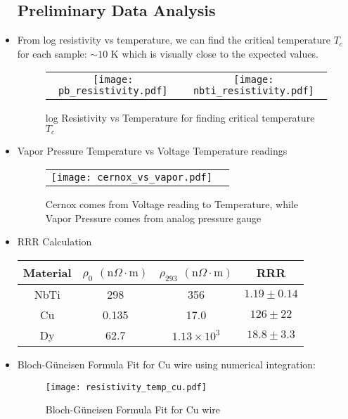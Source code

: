 \documentclass{article}
\begin{document}
\begin{itemize}
    \subsection*{Preliminary Data Analysis}
    \item From log resistivity vs temperature, we can find the critical temperature $T_c$ for each sample: $\sim 10$ K which is visually close to the expected values.
    \begin{figure}[ht]
        \centering
        \begin{tabular}{cc}
            \texttt{[image: pb\_resistivity.pdf]} & \texttt{[image: nbti\_resistivity.pdf]} 
        \end{tabular}
        \caption{log Resistivity vs Temperature for finding critical temperature $T_c$}
    \end{figure}

    \newpage
    \item Vapor Pressure Temperature vs Voltage Temperature readings
    \begin{figure}[ht]
        \centering
        \begin{tabular}{cc}
            \texttt{[image: cernox\_vs\_vapor.pdf]}
        \end{tabular}
        \caption{Cernox comes from Voltage reading to Temperature, while Vapor Pressure comes from analog pressure gauge}
    \end{figure}
    
    \item RRR Calculation
    \begin{table}[ht]
        \centering
        \begin{tabular}{|c|c|c|c|}
        \hline
        Material & $\rho_{0}$ $(\text{n} \Omega \cdot \text{m})$ & $\rho_{293}$ $(\text{n} \Omega \cdot \text{m})$ & RRR  \\ 
        \hline
        NbTi & 298 & 356 & $1.19 \pm 0.14$ \\
        \hline
        Cu & 0.135 & 17.0 & $126 \pm 22$ \\
        \hline
        Dy & 62.7 & $1.13 \times 10^{3}$ & $18.8 \pm 3.3$\\
        \hline
        \end{tabular}
    \end{table}

    \item Bloch-G\"uneisen Formula Fit for Cu wire using numerical integration:
    \begin{figure}[ht]
        \centering
        \texttt{[image: resistivity\_temp\_cu.pdf]}
        \caption{Bloch-G\"uneisen Formula Fit for Cu wire}
    \end{figure}


\end{itemize}
\end{document}
